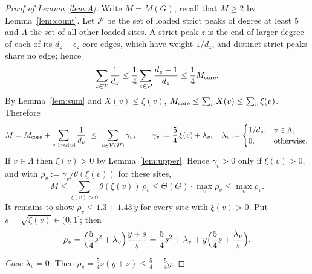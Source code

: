 \documentclass[11pt,a4paper]{article}
\theoremstyle{definition}
\theoremstyle{remark}
\numberwithin{equation}{section}
\begin{document}
\begin{proof}[Proof of Lemma~\ref{lem:A}]
Write $M=M(G)$; recall that $M\ge2$ by Lemma~\ref{lem:count}. Let $\mathcal P$ be
the set of loaded strict peaks of degree at least $5$ and $\Lambda$ the set of all
other loaded sites. A strict peak $z$ is the end of larger degree of each of its
$d_z-\epsilon_z$ core edges, which have weight $1/d_z$, and distinct strict peaks
share no edge; hence
\[
 \sum_{z\in\mathcal P}\frac1{d_z}\le\frac14\sum_{z\in\mathcal P}\frac{d_z-1}{d_z}\le
 \frac14M_{\rm core}.
\]
By Lemma~\ref{lem:sum} and $X(v)\le\xi(v)$,
$M_{\rm core}\le\sum_vX(v)\le\sum_v\xi(v)$. Therefore
\begin{equation}\label{eq:gain}
 M=M_{\rm core}+\sum_{v\ \rm loaded}\frac1{d_v}\ \le\ \sum_{v\in V(H)}\gamma_v,\qquad
 \gamma_v:=\frac54\,\xi(v)+\lambda_v,\quad
 \lambda_v:=\begin{cases}1/d_v,&v\in\Lambda,\\0,&\text{otherwise.}\end{cases}
\end{equation}
If $v\in\Lambda$ then $\xi(v)>0$ by Lemma~\ref{lem:upper}. Hence $\gamma_v>0$ only
if $\xi(v)>0$, and with $\rho_v:=\gamma_v/\theta(\xi(v))$ for these sites,
\[
 M\le\sum_{\xi(v)>0}\theta(\xi(v))\,\rho_v\le\Theta(G)\cdot\max_v\rho_v\le\max_v\rho_v .
\]
It remains to show $\rho_v\le1.3+1.43\,y$ for every site with $\xi(v)>0$. Put
$s=\sqrt{\xi(v)}\in(0,1]$; then
\[
 \rho_v=\Bigl(\frac54s^2+\lambda_v\Bigr)\frac{y+s}{s}
 =\frac54s^2+\lambda_v+y\Bigl(\frac54s+\frac{\lambda_v}{s}\Bigr).
\]

\emph{Case $\lambda_v=0$.} Then $\rho_v=\frac54s(y+s)\le\frac54+\frac54y$.


\end{proof}
\end{document}
